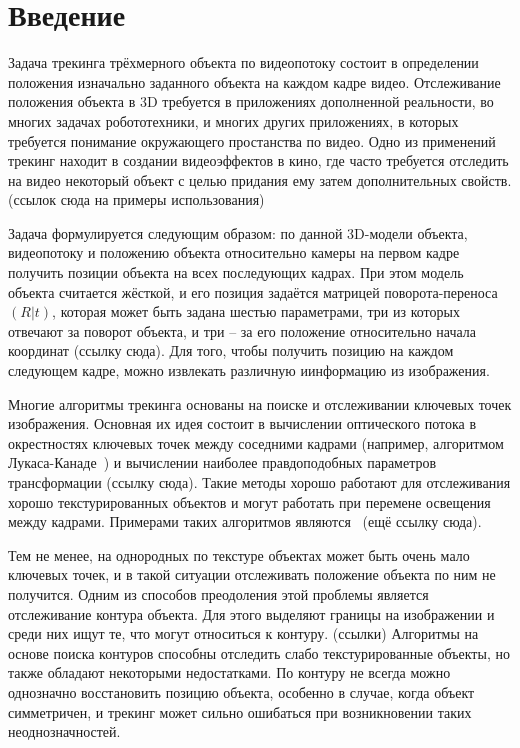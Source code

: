 \section{Введение}

Задача трекинга трёхмерного объекта по видеопотоку состоит в определении положения изначально заданного объекта на каждом кадре видео. Отслеживание положения объекта в 3D требуется в приложениях дополненной реальности, во многих задачах робототехники, и многих других приложениях, в которых требуется понимание окружающего простанства по видео. Одно из применений трекинг находит в создании видеоэффектов в кино, где часто требуется отследить на видео некоторый объект с целью придания ему затем дополнительных свойств. (ссылок сюда на примеры использования)

Задача формулируется следующим образом: по данной 3D-модели объекта, видеопотоку и положению объекта относительно камеры на первом кадре получить позиции объекта на всех последующих кадрах. При этом модель объекта считается жёсткой, и его позиция задаётся матрицей поворота-переноса $(R | t)$, которая может быть задана шестью параметрами, три из которых отвечают за поворот объекта, и три -- за его положение относительно начала координат (ссылку сюда). Для того, чтобы получить позицию на каждом следующем кадре, можно извлекать различную иинформацию из изображения. 

Многие алгоритмы трекинга основаны на поиске и отслеживании ключевых точек изображения. Основная их идея состоит в вычислении оптического потока в окрестностях ключевых точек между соседними кадрами (например, алгоритмом Лукаса-Канаде~\cite{LukasKanade}) и вычислении наиболее правдоподобных параметров трансформации (ссылку сюда). Такие методы хорошо работают для отслеживания хорошо текстурированных объектов и могут работать при перемене освещения между кадрами. Примерами таких алгоритмов являются~\cite{LourakisFeatures} (ещё ссылку сюда). 

Тем не менее, на однородных по текстуре объектах может быть очень мало ключевых точек, и в такой ситуации отслеживать положение объекта по ним не получится. Одним из способов преодоления этой проблемы является отслеживание контура объекта. Для этого выделяют границы на изображении и среди них ищут те, что могут относиться к контуру. (ссылки)
Алгоритмы на основе поиска контуров способны отследить слабо текстурированные объекты, но также обладают некоторыми недостатками. По контуру не всегда можно однозначно восстановить позицию объекта, особенно в случае, когда объект симметричен, и трекинг может сильно ошибаться при возникновении таких неоднозначностей.

